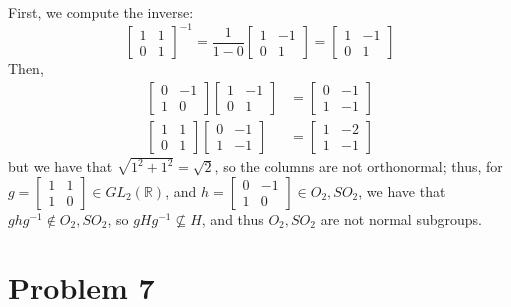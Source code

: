 \documentclass[12pt,letterpaper]{article}
\theoremstyle{definition}
\newcommand{\R}{\mathbb{R}}
\begin{document}
First, we compute the inverse:
\[
  \begin{bmatrix}
    1 & 1 \\ 0 & 1
  \end{bmatrix}^{-1} = \frac{1}{1 - 0} \begin{bmatrix}
    1 & -1 \\ 0 & 1
  \end{bmatrix} = \begin{bmatrix}
    1 & -1 \\ 0 & 1
  \end{bmatrix}
\]
Then,
\begin{align*}
  \begin{bmatrix}
    0 & -1 \\ 1 & 0
  \end{bmatrix}
  \begin{bmatrix}
    1 & -1 \\ 0 & 1
  \end{bmatrix} &=
  \begin{bmatrix}
    0 & -1 \\ 1 & -1
  \end{bmatrix} \\
  \begin{bmatrix}
    1 & 1 \\ 0 & 1
  \end{bmatrix}
  \begin{bmatrix}
    0 & -1 \\ 1 & -1
  \end{bmatrix} &=
  \begin{bmatrix}
    1 & -2 \\ 1 & -1
  \end{bmatrix}
\end{align*}
but we have that $\sqrt{1^{2} + 1^{2}} = \sqrt{2}$, so the columns are not orthonormal; thus, for $g = \begin{bmatrix} 1 & 1 \\ 1 & 0 \end{bmatrix} \in GL_{2}(\R)$, and $h = \begin{bmatrix} 0 & -1 \\ 1 & 0\end{bmatrix} \in O_{2}, SO_{2}$, we have that $ghg^{-1} \notin O_{2}, SO_{2}$, so $gHg^{-1} \not\subseteq H$, and thus $O_{2}, SO_{2}$ are not normal subgroups.

\section*{Problem 7}
\end{document}
